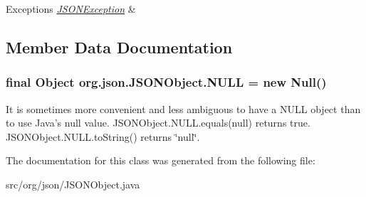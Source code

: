\begin{DoxyExceptions}{Exceptions}
{\em \hyperlink{classorg_1_1json_1_1JSONException}{J\-S\-O\-N\-Exception}} & \\
\hline
\end{DoxyExceptions}


\subsection{Member Data Documentation}
\hypertarget{classorg_1_1json_1_1JSONObject_a01c74a31a1abfd34ab13beb9347855ac}{
\subsubsection[{N\-U\-L\-L}]{\setlength{\rightskip}{0pt plus 5cm}final Object org.\-json.\-J\-S\-O\-N\-Object.\-N\-U\-L\-L = new Null()\hspace{0.3cm}{\ttfamily [static]}}}\label{classorg_1_1json_1_1JSONObject_a01c74a31a1abfd34ab13beb9347855ac}
It is sometimes more convenient and less ambiguous to have a {\ttfamily N\-U\-L\-L} object than to use Java's {\ttfamily null} value. {\ttfamily J\-S\-O\-N\-Object.\-N\-U\-L\-L.\-equals(null)} returns {\ttfamily true}. {\ttfamily J\-S\-O\-N\-Object.\-N\-U\-L\-L.\-to\-String()} returns {\ttfamily \char`\"{}null\char`\"{}}. 

The documentation for this class was generated from the following file\-:\begin{DoxyCompactItemize}
\item 
src/org/json/J\-S\-O\-N\-Object.\-java\end{DoxyCompactItemize}
